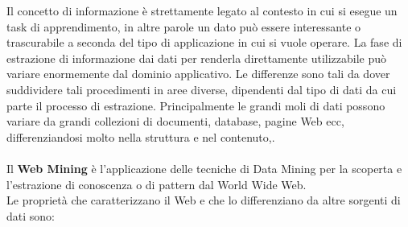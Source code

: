 Il concetto di informazione è strettamente legato al contesto in cui si esegue un task di apprendimento, in altre parole un dato può essere interessante o trascurabile a seconda del tipo di applicazione in cui si vuole operare. La fase di estrazione di informazione dai dati per renderla direttamente utilizzabile può variare enormemente dal dominio applicativo. Le differenze sono tali da dover suddividere tali procedimenti in aree diverse, dipendenti dal tipo di dati da cui parte il processo di estrazione. Principalmente le grandi moli di dati possono variare da grandi collezioni di documenti, database, pagine Web ecc, differenziandosi molto nella struttura e nel contenuto,.
\\\\
Il \textbf{Web Mining} è l’applicazione delle tecniche di Data Mining per la scoperta e l’estrazione di conoscenza o di pattern dal World Wide Web.
\\
Le proprietà che caratterizzano il Web e che lo differenziano da altre sorgenti di dati sono:
